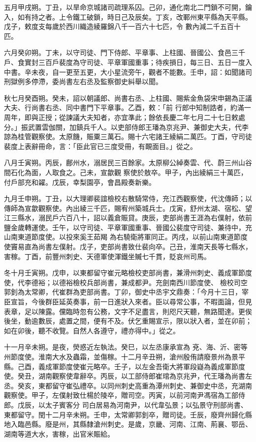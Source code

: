 \begin{pinyinscope}
 五月甲戌朔。丁丑，以旱命京城諸司疏理系囚。己卯，通化南北二門鎖不可開，鑰入，如有持之者。上令鐵工破鎖，時日己及辰矣。丁亥，改鄆州東平縣為天平縣。戊子，敕度支每歲於西川織造綾羅錦八千一百六十七匹，令
 數內減二千五百十匹。



 六月癸卯朔。丁未，以守司徒、門下侍郎、平章事、上柱國、晉國公、食邑三千戶、食實封三百戶裴度為守司徒、平章軍國重事；待疾損日，每三日、五日一度入中書。辛未夜，自一更至五更，大小星流旁午，觀者不能數。壬申，詔：如聞諸司刑獄例多停滯，委尚書左右丞及監察御史糾舉以聞。



 秋七月癸酉朔。癸未，詔以朝議郎、尚書右丞、上柱國、賜紫金魚袋宋申錫為正議大夫、行尚書右丞、同中書門下平章事。乙酉，敕：「前
 行郎中知制誥者，約滿一周年，即與正授；從諫議大夫知者，亦宜準此；餘依長慶二年七月二十七日敕處分。」振武置雲伽關，加鎮兵千人。以吏部侍郎王璠為京兆尹、兼御史大夫，代李諒為桂管觀察使。太原饑，賑粟三萬石。賜十六宅諸王綾絹二萬匹。丁酉，守司徒裴度上表辭冊命，言：「臣此官已三度受冊，有靦面目。」從之。



 八月壬寅朔。丙辰，鄜州水，溺居民三百餘家。太原柳公綽奏雲、代、蔚三州山谷間石化為面，人取食之。己未，宣歙觀
 察使於敖卒。甲子，內出綾絹三十萬匹，付戶部充和糴。戊辰，幸梨園亭，會昌殿奏新樂。



 九月壬申朔。丁丑，以大理卿裴誼檢校右散騎常侍，充江西觀察使，代沈傳師；以傳師為宣歙觀察使。內出綾三千匹，賜宥州築城兵士。戊寅，舒州太湖、宿松、望江三縣水，溺民戶六百八十，詔以義倉賑貸。庚辰，吏部尚書王涯為右僕射，依前鹽金歲轉運使。壬午，以守司徒、平章軍國重事、晉國公裴度守司徒、兼待中，充山南東道節度使。以投來奚王茹羯
 為右驍衛將軍同正。丙戌，以前山南東道節度使竇易直為尚書左僕射。戊子，吏部尚書致仕裴向卒。己丑，淮南天長等七縣水，害稼。丁酉，前豐州刺史、天德軍使渾鐵坐贓七千貫，貶哀州司馬。



 冬十月壬寅朔。戊申，以東都留守崔元略檢校吏部尚書，兼滑州刺史、義成軍節度使，代李德裕；以德裕檢校兵部尚書，兼成都尹。充劍南西川節度使、
 檢校司空郭釗為太常卿，代崔群為吏部尚書。丁卯，御史中丞宇文鼎奏：「今月十三日，宰臣宣旨，今後群臣延英奏事，前一日進狀入來者。臣以尋常公事，不暇面論，但見表章，足以陳露。儻臨時忽有公務，文字不足盡言，則咫尺天聽，無路聞達。更俟後坐，動逾數辰，處置之間，便有不及。伏乞重賜宣示，限以狀入者，並在卯前；如在卯後，聽不收覽。自然人各遵守，禮亦得中。」從之。



 十一月辛未朔。是夜，熒惑近左執法。癸巳，以左丞康承宣為
 兗、海、沂、密等州節度使。淮南大水及蟲霜，並傷稼。十二月辛丑朔，滄州殷侑請廢景州為景平縣。己酉，義成軍節度使崔元略卒。壬子，以左金吾衛大將軍段嶷為義成軍節度使。癸丑，湖南觀察使韋辭卒。丙辰，以工部侍郎崔琯為京兆尹，代王璠為尚書左丞。癸亥，東都留守崔弘禮卒。以同州刺史高重為潭州刺史、兼御史中丞，充湖南觀察使。甲子，左僕射致仕楊於陵卒，贈司空。丙寅，以前河南尹馮宿為工部侍郎。戊辰，以太子賓客分
 司白居易為河南尹，以代韋弘景；以弘景守刑部尚書、東都留守。閏十二月辛未朔。壬申，太常卿郭釗卒，贈司徒。壬辰，廢齊州歸化縣地入臨邑縣。廢是州，其縣隸滄州刺史。是歲，京畿、河南、江南、荊襄、鄂岳、湖南等道大水，害稼，出官米賑給。




\end{pinyinscope}
